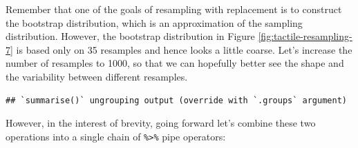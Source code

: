 \documentclass[
]{book}
\newenvironment{Shaded}{\begin{snugshade}}{\end{snugshade}}
\newcommand{\CommentTok}[1]{\textcolor[rgb]{0.56,0.35,0.01}{\textit{#1}}}
\newcommand{\DataTypeTok}[1]{\textcolor[rgb]{0.13,0.29,0.53}{#1}}
\newcommand{\DecValTok}[1]{\textcolor[rgb]{0.00,0.00,0.81}{#1}}
\newcommand{\KeywordTok}[1]{\textcolor[rgb]{0.13,0.29,0.53}{\textbf{#1}}}
\newcommand{\NormalTok}[1]{#1}
\newcommand{\OperatorTok}[1]{\textcolor[rgb]{0.81,0.36,0.00}{\textbf{#1}}}
\newcommand{\OtherTok}[1]{\textcolor[rgb]{0.56,0.35,0.01}{#1}}
\newcommand{\StringTok}[1]{\textcolor[rgb]{0.31,0.60,0.02}{#1}}
\begin{document}
Remember that one of the goals of resampling with replacement is to construct the bootstrap distribution, which is an approximation of the sampling distribution. However, the bootstrap distribution in Figure \ref{fig:tactile-resampling-7} is based only on 35 resamples and hence looks a little coarse. Let's increase the number of resamples to 1000, so that we can hopefully better see the shape and the variability between different resamples.

\begin{Shaded}
\end{Shaded}

\begin{verbatim}
## `summarise()` ungrouping output (override with `.groups` argument)
\end{verbatim}

However, in the interest of brevity, going forward let's combine these two operations into a single chain of \texttt{\%\textgreater{}\%} pipe operators:

\begin{Shaded}
\end{Shaded}
\end{document}
